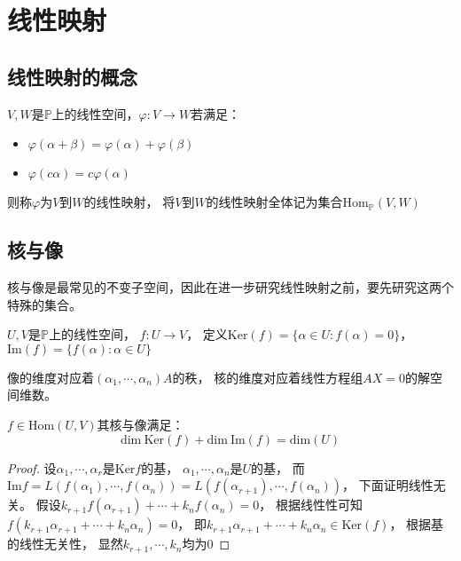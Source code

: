 
\section{线性映射}


\subsection{线性映射的概念}

\begin{definition}[线性映射]
  $V,W$是$\mathbb{P}$上的线性空间，$\varphi : V \rightarrow W$若满足：
  \begin{itemize}
  \item $\varphi(\alpha + \beta) = \varphi(\alpha) + \varphi(\beta)$
  \item $\varphi(c\alpha) = c \varphi(\alpha)$
  \end{itemize}
  则称$\varphi$为$V$到$W$的线性映射，
  将$V$到$W$的线性映射全体记为集合$\mathrm{Hom}_{\mathbb{P}}(V,W)$
\end{definition}

\subsection{核与像}

核与像是最常见的不变子空间，因此在进一步研究线性映射之前，要先研究这两个特殊的集合。

\begin{definition}[核与像]
  $U,V$是$\mathbb{P}$上的线性空间，
  $f:U \rightarrow V$，
  定义$\mathrm{Ker}(f) = \{\alpha \in U: f(\alpha ) = 0\}$，
  $\mathrm{Im}(f) = \{f(\alpha):\alpha \in U\}$
\end{definition}

\begin{note}
  像的维度对应着$(\alpha_1,\cdots,\alpha_n)A$的秩，
  核的维度对应着线性方程组$AX = 0$的解空间维数。
\end{note}

\begin{theorem}[核像维数公式]
  $f \in \mathrm{Hom}(U,V)$其核与像满足：
  \begin{equation*}
    \mathrm{dim} ~ \mathrm{Ker}(f) + \mathrm{dim} ~ \mathrm{Im}(f) = \mathrm{dim}(U)
  \end{equation*}
\end{theorem}

\begin{proof}
  设$\alpha_1,\cdots,\alpha_r$是$\mathrm{Ker}f$的基，
  $\alpha_1,\cdots,\alpha_n$是$U$的基，
  而$\mathrm{Im}f = L(f(\alpha_1),\cdots,f(\alpha_n)) = L(f(\alpha_{r+1}),\cdots,f(\alpha_n))$，
  下面证明线性无关。
  假设$k_{r+1}f(\alpha_{r+1}) + \cdots + k_n f(\alpha_n) = 0$，
  根据线性性可知$f(k_{r+1}\alpha_{r+1} + \cdots + k_n\alpha_n) = 0$，
  即$k_{r+1}\alpha_{r+1} + \cdots + k_n \alpha_n \in \mathrm{Ker}(f)$，
  根据基的线性无关性，
  显然$k_{r+1},\cdots,k_n$均为$0$
\end{proof}

